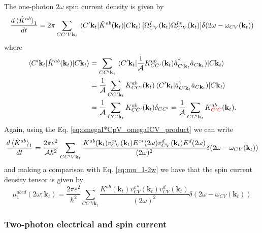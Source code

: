 \documentclass{article}
\newcommand{\kt}{\mathbf{k}_{t}}
\begin{document}
The one-photon $2\omega$ spin current density is given by
\begin{equation}
\frac{d\ev*{\hat{K}^{ab}}_{1}}{dt} = 2 \pi \sum_{CC'V\kt} \mel{C'\kt}
{\hat{K}^{ab}(\kt)}{C\kt} [\Omega^{I}_{CV}(\kt) \Omega^{I*}_{C'V}(\kt)] \delta 
(2\omega - \omega_{CV}(\kt))
\end{equation}
where
\begin{equation*}
\begin{split}
\mel{C'\kt}{\hat{K}^{ab}(\kt)}{C\kt} &= \sum_{CC'\kt} \mel{C'\kt}
{\frac{1}{\mathcal{A}} K^{ab}_{CC'}(\kt) 
\hat{a}^{\dag}_{C'\kt} \hat{a}_{C\kt})}{C\kt}  \\
&= \frac{1}{\mathcal{A}} \sum_{CC'\kt} K^{ab}_{CC'}(\kt) \mel{C'\kt}
{\hat{a}^{\dag}_{C'\kt} \hat{a}_{C\kt})}{C\kt}  \\
&= \frac{1}{\mathcal{A}} \sum_{CC'\kt}
K^{ab}_{CC'}(\kt) \delta_{CC'} = \frac{1}{\mathcal{A}} \sum_{CC'\kt}
K^{ab}_{\color{red}{C'C}}(\kt) .
\end{split}
\end{equation*}
Again, using the Eq. \eqref{eq:omegaI*CpV_omegaICV_product} we can write
\begin{equation}
\frac{d\ev*{\hat{K}^{ab}}_{1}}{dt} = \frac{2 \pi e^{2}}{\mathcal{A} \hbar^{2}}
\sum_{CC'V\kt} \frac{K^{ab}(\kt) v^{c*}_{CV}(\kt) E^{c*}(2\omega) 
v^{d}_{CV}(\kt) E^{d}(2\omega) }{(2\omega)^{2}} \delta ({2\omega - 
\omega_{CV}(\kt)})
\end{equation}
and making a comparison with Eq. \eqref{eq:mu_1-2w} we have that the spin 
current density tensor is given by
\begin{equation}
\mu^{abcd}_{1} (2\omega;\kt) = \frac{2 \pi e^{2}}{\hbar^{2}}
\sum_{CC'V\kt} \frac{K^{ab}(\kt) v^{c*}_{CV}(\kt) v^{d}_{CV}(\kt)}
{(2\omega)^{2}} \delta ({2\omega - \omega_{CV}(\kt)})
\end{equation}

\subsubsection{Two-photon electrical and spin current}
\end{document}
